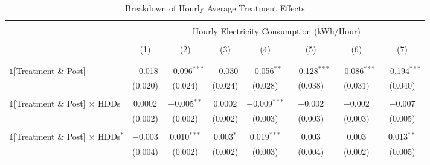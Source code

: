     \begin{table}[ht!]
        \centering
        \caption{Breakdown of Hourly Average Treatment Effects}
        \label{Table:Breakdown-of-Hourly-ATEs_Coefficients-of-Interest-only}
        \vspace{0.3cm}
        \small
        \begin{adjustbox}{scale = 0.75}
            \begin{threeparttable}
                \begin{tabular}{@{\extracolsep{10pt}}lccccccc}
                    \\[-5.5ex]
                    \hline \hline
                    \\[-3.0ex]
                    & \multicolumn{7}{c}{Hourly Electricity Consumption  (kWh/Hour)} \\
                    \\[-3.0ex]
                    & (1) & (2) & (3) & (4) & (5) & (6) & (7) \\
                    \\[-3.0ex]
                    \hline
                    \\[-2.0ex]
                    $\mathbb{1}$[Treatment \& Post] & $-$0.018 & $-$0.096$^{***}$ & $-$0.030 & $-$0.056$^{**}$ & $-$0.128$^{***}$ & $-$0.086$^{***}$ & $-$0.194$^{***}$ \\
                    & (0.020) & (0.024) & (0.024) & (0.028) & (0.038) & (0.031) & (0.040) \\
                    & & & & & & & \\
                    $\mathbb{1}$[Treatment \& Post] $\times$ HDDs & 0.0002 & $-$0.005$^{**}$ & 0.0002 & $-$0.009$^{***}$ & $-$0.002 & $-$0.002 & $-$0.007 \\
                    & (0.002) & (0.002) & (0.002) & (0.003) & (0.003) & (0.003) & (0.005) \\
                    & & & & & & & \\
                    $\mathbb{1}$[Treatment \& Post] $\times$ HDDs$^{*}$ & $-$0.003 & 0.010$^{***}$ & 0.003$^{*}$ & 0.019$^{***}$ & 0.003 & 0.003 & 0.013$^{**}$ \\
                    & (0.004) & (0.002) & (0.002) & (0.003) & (0.004) & (0.002) & (0.005) \\

\end{tabular}
\end{threeparttable}
\end{adjustbox}
\end{table}
